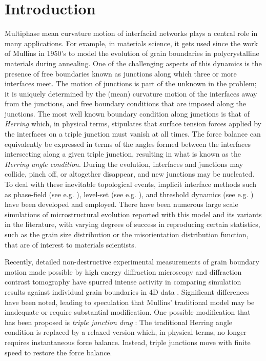 \documentclass{article}
\theoremstyle{plain}
\theoremstyle{definition}
\theoremstyle{remark}
\begin{document}
\section{Introduction}
\label{sec:intro}
Multiphase mean curvature motion of interfacial networks plays a central role in many applications.
For example, in materials science, it gets used since the work of Mullins \cite{mullins} in 1950's to model the evolution of grain boundaries in polycrystalline materials during annealing.
One of the challenging aspects of this dynamics is the presence of free boundaries known as junctions along which three or more interfaces meet.
The motion of junctions is part of the unknown in the problem; it is uniquely determined by the (mean) curvature motion of the interfaces away from the junctions, and free boundary conditions that are imposed along the junctions.
The most well known boundary condition along junctions is that of {\em Herring} \cite{herring} which, in physical terms, stipulates that surface tension forces applied by the interfaces on a triple junction must vanish at all times.
The force balance can equivalently be expressed in terms of the angles formed between the interfaces intersecting along a given triple junction, resulting in what is known as the {\em Herring angle condition}.
During the evolution, interfaces and junctions may collide, pinch off, or altogether disappear, and new junctions may be nucleated.
To deal with these inevitable topological events, implicit interface methods such as phase-field (see e.g. \cite{lqchen, lqchen2, fan}), level-set (see e.g. \cite{osher_sethian,elsey1,bernacki,elsey2,saye_sethian_2011}), and threshold dynamics (see e.g. \cite{mbo92,esedoglu_otto,elsey3,peng_2022,rohrer_annual}) have been developed and employed.
There have been numerous large scale simulations of microstructural evolution reported with this model and its variants in the literature, with varying degrees of success in reproducing certain statistics, such as the grain size distribution or the misorientation distribution function, that are of interest to materials scientists.

Recently, detailed non-destructive experimental measurements of grain boundary motion made possible by high energy diffraction microscopy and diffraction contrast tomography have spurred intense activity in comparing simulation results against individual grain boundaries in 4D data \cite{mckenna,peng_2022,rohrer_annual}.
Significant differences have been noted, leading to speculation that Mullins' traditional model may be inadequate or require substantial modification.
One possible modification that has been proposed is {\em triple junction drag} \cite{GOTTSTEIN2002703,barmak,epshteyn,yangesedoglu25}: The traditional Herring angle condition is replaced by a relaxed version which, in physical terms, no longer requires instantaneous force balance.
Instead, triple junctions move with finite speed to restore the force balance.
\end{document}
